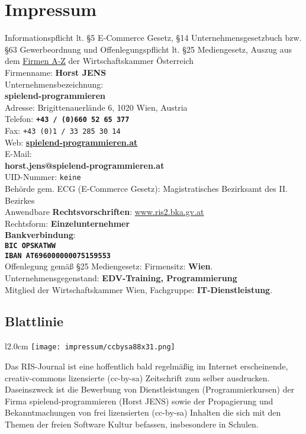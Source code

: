 \section*{Impressum} 
\label{impressum}
\footnotesize 
Informationspflicht lt. §5 E-Commerce Gesetz, §14 Unternehmensgesetzbuch bzw. §63 Gewerbeordnung und Offenlegungspflicht lt. §25 Mediengesetz, 
Auszug aus dem \href{http://www.wkoecg.at/Web/Ecg.aspx?FirmaID=27aeca80-2eac-430b-9aee-31eeaeea1fa9}{Firmen A-Z} der Wirtschaftskammer Österreich \\
Firmenname: \textbf{Horst JENS}\\ 
Unternehmensbezeichnung:\\
\textbf{spielend-programmieren}\\
Adresse: Brigittenauerlände 6, 1020 Wien, Austria\\
Telefon: \texttt{\textbf{+43 / (0)660 52 65 377}}\\
Fax: \texttt{+43 (0)1 / 33 285 30 14}\\
Web: \href{http://spielend-programmieren.at}{\textbf{spielend-programmieren.at}}\\
E-Mail:\\
\textbf{horst.jens@spielend-programmieren.at}\\
UID-Nummer: \texttt{keine}\\
Behörde gem. ECG (E-Commerce Gesetz): Magistratisches Bezirksamt des II. Bezirkes\\
Anwendbare \textbf{Rechtsvorschriften}:	\href{http://www.ris2.bka.gv.at}{www.ris2.bka.gv.at}\\
Rechtsform:	\textbf{Einzelunternehmer}\\
\textbf{Bankverbindung}: \\
\textbf{\texttt{BIC OPSKATWW} \\
\texttt{IBAN AT696000000075159553}} \\
Offenlegung gemäß §25 Mediengesetz: Firmensitz: \textbf{Wien}. 
Unternehmensgegenstand: \textbf{EDV-Training, Programmierung}\\
Mitglied der Wirtschaftskammer Wien, Fachgruppe: \textbf{IT-Dienstleistung}.

\subsection*{Blattlinie}
\begin{wrapfigure}{l}{2.0cm}
\texttt{[image: impressum/ccbysa88x31.png]}
\end{wrapfigure}
Das RIS-Journal ist eine hoffentlich bald regelmäßig im Internet erscheinende, creativ-commons lizensierte (cc-by-sa) Zeitschrift zum selber ausdrucken. Daseinszweck ist die Bewerbung von Dienstleistungen (Programmierkursen) der Firma spielend-programmieren (Horst JENS) sowie der Propagierung und Bekanntmachungen von frei lizensierten (cc-by-sa) Inhalten die sich mit den Themen der freien Software Kultur befassen, insbesondere in Schulen. 

